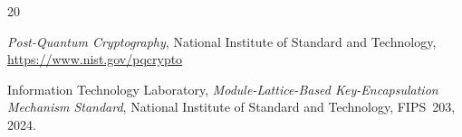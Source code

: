 \documentclass{llncs}
\newcommand{\GF}{GF}
\begin{document}
\begin{thebibliography}{20}







\emph{Post-Quantum Cryptography},
National Institute of Standard and Technology,\\
\url{https://www.nist.gov/pqcrypto}




Information Technology Laboratory,
\emph{Module-Lattice-Based Key-Encapsulation Mechanism Standard},
National Institute of Standard and Technology, FIPS~203, 2024.


\end{thebibliography}
\end{document}
